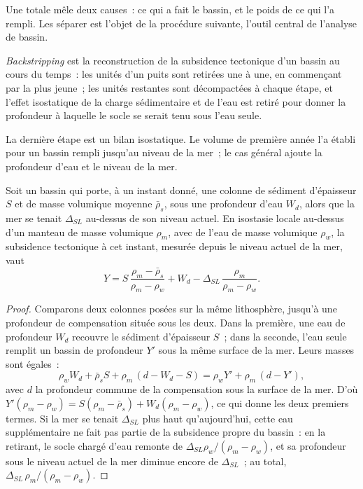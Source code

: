 Une  totale mêle deux causes~: ce qui a fait le bassin, et le poids de ce qui
l'a rempli. Les séparer est l'objet de la procédure suivante, l'outil central de
l'analyse de bassin.

\begin{definition}[Backstripping]\label{def:b2:basins-compared:backstripping}
\emph{Backstripping} est la reconstruction de la subsidence tectonique d'un bassin au cours du temps~:
les unités d'un puits sont retirées une à une, en commençant par la plus jeune~; les unités restantes sont décompactées
à chaque étape, et l'effet isostatique de la charge sédimentaire et de l'eau est retiré pour donner la profondeur
à laquelle le socle se serait tenu sous l'eau seule.
\end{definition}

La dernière étape est un bilan isostatique. Le volume de première année l'a établi pour un bassin rempli jusqu'au niveau de la mer~;
le cas général ajoute la profondeur d'eau et le niveau de la mer.

\begin{proposition}\label{prop:b2:basins-compared:backstrip}
Soit un bassin qui porte, à un instant donné, une colonne de sédiment d'épaisseur $S$ et de masse volumique moyenne
$\bar\rho_s$, sous une profondeur d'eau $W_d$, alors que la mer se tenait $\Delta_{SL}$ au-dessus de son niveau actuel.
En isostasie locale au-dessus d'un manteau de masse volumique $\rho_m$, avec de l'eau de masse volumique $\rho_w$, la
subsidence tectonique à cet instant, mesurée depuis le niveau actuel de la mer, vaut
\[
  Y = S\,\frac{\rho_m - \bar\rho_s}{\rho_m - \rho_w} + W_d
      - \Delta_{SL}\,\frac{\rho_m}{\rho_m - \rho_w}.
\]
\end{proposition}

\begin{proof}
Comparons deux colonnes posées sur la même lithosphère, jusqu'à une profondeur de compensation située sous les deux. Dans
la première, une eau de profondeur $W_d$ recouvre le sédiment d'épaisseur $S$~; dans la seconde, l'eau seule
remplit un bassin de profondeur $Y'$ sous la même surface de la mer. Leurs masses sont égales~:
\[
  \rho_w W_d + \bar\rho_s S + \rho_m\,(d - W_d - S) = \rho_w Y' + \rho_m\,(d - Y'),
\]
avec $d$ la profondeur commune de la compensation sous la surface de la mer. D'où
$Y'(\rho_m - \rho_w) = S(\rho_m - \bar\rho_s) + W_d(\rho_m - \rho_w)$, ce qui donne les deux premiers
termes. Si la mer se tenait $\Delta_{SL}$ plus haut qu'aujourd'hui, cette eau supplémentaire ne fait pas partie de la
subsidence propre du bassin~: en la retirant, le socle chargé d'eau remonte de
$\Delta_{SL}\rho_w/(\rho_m - \rho_w)$, et sa profondeur sous le niveau actuel de la mer diminue encore de
$\Delta_{SL}$~; au total, $\Delta_{SL}\,\rho_m/(\rho_m - \rho_w)$.
\end{proof}

